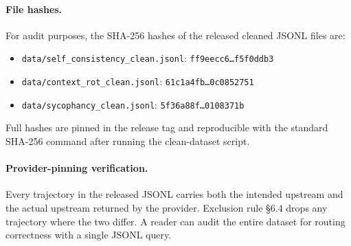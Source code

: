 \paragraph{File hashes.}
For audit purposes, the SHA-256 hashes of the released cleaned JSONL
files are:
\begin{itemize}
  \item \texttt{data/self\_consistency\_clean.jsonl}: \texttt{ff9eecc6\dots f5f0ddb3}
  \item \texttt{data/context\_rot\_clean.jsonl}: \texttt{61c1a4fb\dots 0c0852751}
  \item \texttt{data/sycophancy\_clean.jsonl}: \texttt{5f36a88f\dots 0108371b}
\end{itemize}
Full hashes are pinned in the release tag and reproducible with
the standard SHA-256 command after running the clean-dataset script.

\paragraph{Provider-pinning verification.}
Every trajectory in the released JSONL carries both the intended
upstream and the actual upstream returned by the provider. Exclusion
rule \S6.4 drops any trajectory where the two differ. A reader can audit
the entire dataset for routing correctness with a single JSONL query.
